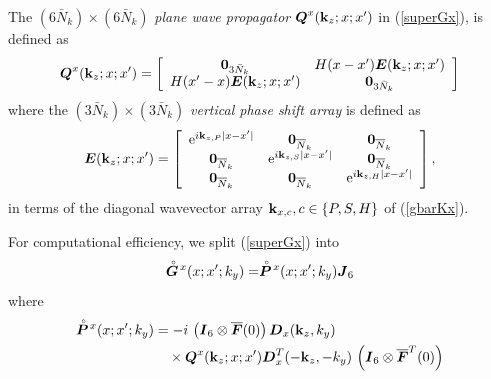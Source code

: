 \documentclass[11pt,a4paper]{article}
\newcommand{\bmi}[1]{\mbox{\boldmath$\mit #1$\unboldmath}}
\newcommand{\rf}[1]{\stackrel{\scriptscriptstyle _{\,\,\circ}}{ #1}}
\begin{document}
The $(6\bar{N}_k)\times (6\bar{N}_k)$ {\em plane wave propagator\/}
${\bmi Q}^{x}({\bf k}_{z};x;x^{\prime})$ in (\ref{superGx}),
is defined  as
\begin{equation} \label{gQxdef}
{\bmi Q}^{x}({\bf k}_z;x;x^{\prime})=
\left[{\begin{array}{cc}{\bf 0}_{3\bar{N}_k}&H(x-{x}^{\prime}){\bmi E}({\bf
k}_z;x;{x}^{\prime})\\
H(x^{\prime}-{x}){\bmi E}({\bf k}_z;x;{x}^{\prime})&{\bf 0}_{3\bar{N}_k}\end{array}}\right]
\end{equation}
where the $(3\bar{N}_k)\times (3\bar{N}_k)$ {\em vertical phase shift array\/} is
defined as
\[
{\bmi E}({\bf k}_z;x;{x}^{\prime})=\left[{\begin{array}{ccc}
{\rm e}^{i{\bf k}_{z,P}|x-{x}^{\prime}|}&{\bf 0}_{\overline{N}_k}&{\bf 0}_{\overline{N}_k}\\
{\bf 0}_{\overline{N}_k}&{\rm e}^{
i{\bf k}_{z,S}|x-{x}^{\prime}|}&{\bf 0}_{\overline{N}_k}\\ {\bf 0}_{\overline{N}_k}&{\bf 0}_{\overline{N}_k}&
{\rm e}^{
i{\bf k}_{z,H}|x-{x}^{\prime}|}\end{array}}\right] ,
\]
in terms of the diagonal wavevector array ${\bf k}_{x,c}, c\in\{P,S,H
\}$ of (\ref{gbarKx}).

For computational efficiency, we split (\ref{superGx}) into
\[
\rf{\bmi G}\!{}^{x}({ x};{ x}^{\prime};k_y)=\rf{\bmi P}\!{}^{x}({ x};{ x}^{\prime};k_y){\bmi  J}_6
\]
where
\begin{align} \label{superPx}
\rf{\bmi P}\!{}^{x}({ x};{ x}^{\prime};k_y)
&=- i\,
\left({\bmi I}_6\otimes \overline{\bmi F}(0)  \right)
 {\bmi  D}_{x}({\bf k}_{z},{k}_{y})\nonumber\\
&\quad\times
{\bmi Q}^{x}({\bf k}_{z};x;x^{\prime}){\bmi  D}_{x}^{T}(-{\bf k}_{z},-{k}_{y})
\,\left({\bmi I}_6\otimes \overline{\bmi F}^{T}(0)  \right)
\end{align}
\end{document}
